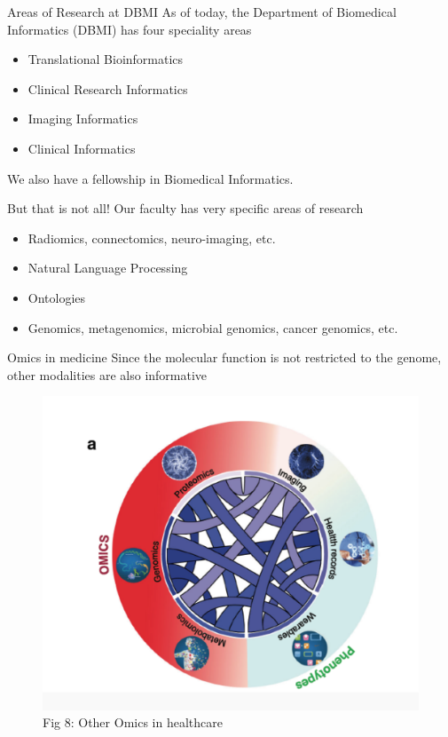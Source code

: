 \documentclass[11pt, aspectratio=43]{beamer}
\begin{document}
\begin{frame}{Areas of Research at DBMI}
	As of today, the Department of Biomedical Informatics (DBMI) has four speciality areas
	
	\begin{itemize}
		\item Translational Bioinformatics
		\item Clinical Research Informatics
		\item Imaging Informatics
		\item Clinical Informatics 
	\end{itemize}
	We also have a fellowship in Biomedical Informatics. 
	
	But that is not all! Our faculty has very specific areas of research
	\begin{itemize}
		\item Radiomics, connectomics, neuro-imaging, etc.
		\item Natural Language Processing
		\item Ontologies
		\item Genomics, metagenomics, microbial genomics, cancer genomics, etc.
	\end{itemize}
	
\end{frame}


\begin{frame}{Omics in medicine}
	Since the molecular function is not restricted to the genome, other
	modalities are also informative
	\begin{figure}[h]
		\centering
		\includegraphics[scale=0.45]{Figures/multiomics.png}
		\caption{Fig 8: Other Omics in healthcare}
	\end{figure}	
	
\end{frame}
\end{document}
